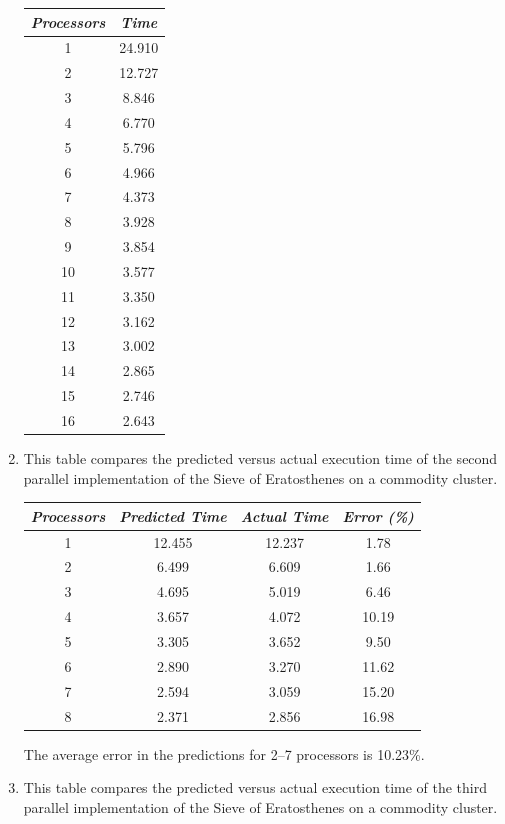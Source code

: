 \begin{enumerate}
\begin{tabular}{|c|c|}
\hline
{\it Processors}&{\it Time} \\
\hline
1 & 24.910 \\
2 & 12.727 \\
3 & 8.846  \\
4 & 6.770 \\
5 & 5.796 \\
6 & 4.966 \\
7 & 4.373 \\
8 & 3.928 \\
9 & 3.854 \\
10 & 3.577 \\
11 & 3.350 \\
12 & 3.162 \\
13 & 3.002 \\
14 & 2.865 \\
15 & 2.746 \\
16 & 2.643 \\
\hline
\end{tabular}
            
\item This table compares the predicted versus actual execution time of
      the second parallel implementation of the Sieve of Eratosthenes on
      a commodity cluster.

\begin{tabular}{|c|c|c|c|}
\hline
{\it Processors}&{\it Predicted Time} & {\it Actual Time} & {\it Error (\%)}\\
\hline
1 & 12.455 & 12.237 & 1.78\\
2 & 6.499 &  6.609  & 1.66\\
3 & 4.695 &  5.019  & 6.46\\
4 & 3.657 &  4.072  & 10.19\\
5 & 3.305 &  3.652  & 9.50\\
6 & 2.890 &  3.270  & 11.62\\
7 & 2.594 &  3.059  & 15.20\\
8 & 2.371 &  2.856  & 16.98\\
\hline
\end{tabular}

The average error in the predictions for 2--7 processors is 10.23\%.

\vfill\eject

\item This table compares the predicted versus actual execution time of
      the third parallel implementation of the Sieve of Eratosthenes on
      a commodity cluster.


\end{enumerate}
